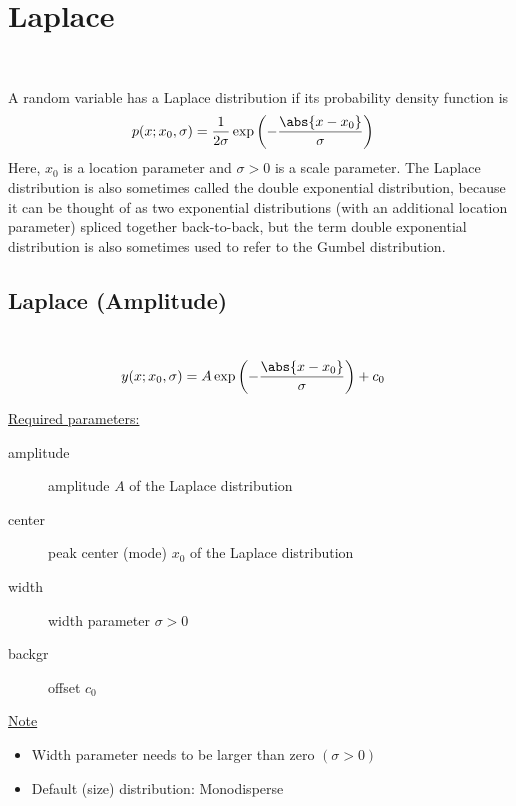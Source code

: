 \section{Laplace} ~\\
\label{sec:Laplace}

A random variable has a Laplace
distribution if its probability density function is
\begin{align}
p(x;x_0,\sigma) &= \frac{1}{2\sigma} \exp \left(
-\frac{\abs{x-x_0}}{\sigma}\right)
\end{align}
Here, $x_0$ is a location parameter and $\sigma > 0$ is a scale
parameter. The Laplace distribution is also sometimes called the
double exponential distribution, because it can be thought of as two
exponential distributions (with an additional location parameter)
spliced together back-to-back, but the term double exponential
distribution is also sometimes used to refer to the Gumbel
distribution.

\vspace{1cm}
\subsection{Laplace (Amplitude)} ~\\
\label{sec:LaplaceAmplitude}
\begin{align}
y(x;x_0,\sigma) &= A \exp \left(
-\frac{\abs{x-x_0}}{\sigma}\right) + c_0
\end{align}


\uline{Required parameters:}
\begin{description}
    \item[amplitude] amplitude $A$ of the Laplace distribution
    \item[center] peak center (mode) $x_0$ of the Laplace distribution
    \item[width] width parameter $\sigma>0$
    \item[backgr] offset $c_0$
\end{description}

\uline{Note}
\begin{itemize}
  \item Width parameter needs to be larger than zero $(\sigma>0)$
  \item Default (size) distribution: Monodisperse
\end{itemize}

